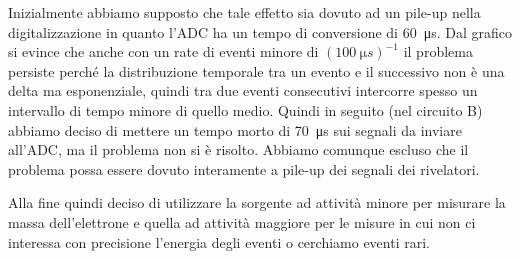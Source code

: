 Inizialmente abbiamo supposto che tale effetto sia dovuto ad un pile-up nella digitalizzazione in quanto l'ADC ha un tempo di conversione di \SI{60}{\micro s}.
Dal grafico si evince che anche con un rate di eventi minore di $(\SI{100}{\micro s})^{-1}$ il problema persiste perché la distribuzione temporale tra un evento e il successivo non è una delta ma esponenziale, quindi tra due eventi consecutivi intercorre spesso un intervallo di tempo minore di quello medio.
Quindi in seguito (nel circuito B) abbiamo deciso di mettere un tempo morto di \SI{70}{\micro s} sui segnali da inviare all'ADC, ma il problema non si è risolto.
Abbiamo comunque escluso che il problema possa essere dovuto interamente a pile-up dei segnali dei rivelatori.

Alla fine quindi deciso di utilizzare la sorgente ad attività minore per misurare la massa dell'elettrone e quella ad attività maggiore per le misure in cui non ci interessa con precisione l'energia degli eventi o cerchiamo eventi rari.